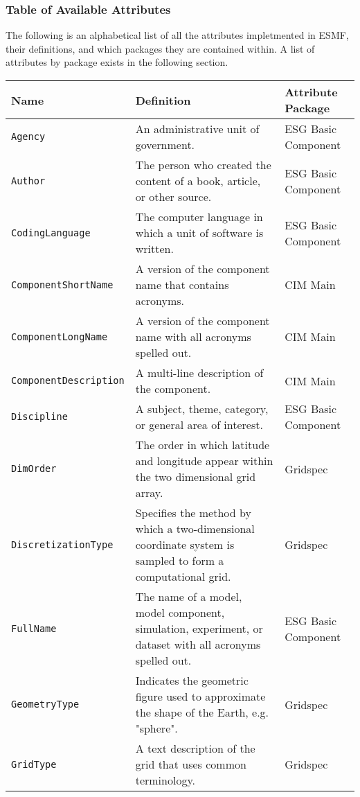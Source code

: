 \vspace{.20in}
\subsubsection{Table of Available Attributes}

The following is an alphabetical list of all the attributes impletmented in ESMF, their definitions, and which packages they are contained within. A list of attributes by package exists in the following section. 


\begin{tabular}{|p{8cm}|p{20cm}|p{10cm}}
     \hline\hline
     {\bf Name} & {\bf Definition} & {\bf Attribute Package}\\
     \hline\hline
     {\tt Agency} & An administrative unit of government.& ESG Basic Component\\
     {\tt Author} & The person who created the content of a book, article, or other source. & ESG Basic Component\\
     {\tt CodingLanguage} & The computer language in which a unit of software is written. & ESG Basic Component\\
     {\tt ComponentShortName} & A version of the component name that contains acronyms. & CIM Main\\
     {\tt ComponentLongName} & A version of the component name with all acronyms spelled out. & CIM Main\\
     {\tt ComponentDescription} & A multi-line description of the component. & CIM Main \\
     {\tt Discipline} & A subject, theme, category, or general area of interest.& ESG Basic Component \\
     {\tt DimOrder} & The order in which latitude and longitude appear within the two dimensional grid array. & Gridspec\\ 
     {\tt DiscretizationType} & Specifies the method by which a two-dimensional coordinate system is sampled to form a computational grid.& Gridspec \\
     {\tt FullName} & The name of a model, model component, simulation, experiment, or dataset with all acronyms spelled out.& ESG Basic Component\\
     {\tt GeometryType} & Indicates the geometric figure used to approximate the shape of the Earth, e.g. "sphere". & Gridspec \\
     {\tt GridType} & A text description of the grid that uses common terminology. & Gridspec \\

\end{tabular}
